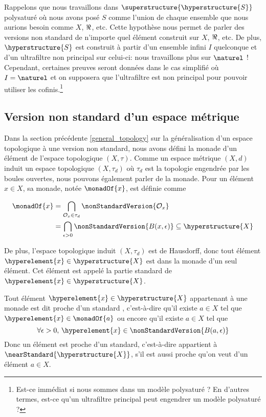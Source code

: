 Rappelons que nous travaillons dans $\superstructure{\hyperstructure{S}}$
polysaturé où nous avons posé $S$ comme l'union de chaque ensemble que nous
aurions besoin comme $X$, $\real$, etc. Cette hypothèse nous permet de parler des
versions non standard de n'importe quel élément construit sur $X$, $\real$, etc.
De plus, $\hyperstructure{S}$ est construit à partir d'un ensemble infini
$I$ quelconque et d'un ultrafiltre non principal sur celui-ci: nous travaillons
plus sur $\naturel$ !
Cependant, certaines preuves seront données dans le cas simplifié où $I =
\naturel$ et on supposera que l'ultrafiltre est non principal pour pouvoir
utiliser les cofinis.\footnote{Est-ce immédiat si nous sommes dans un modèle
	polysaturé ? En d'autres termes, est-ce qu'un ultrafiltre principal peut
engendrer un modèle polysaturé ?}

\subsection{Version non standard d'un espace métrique}

Dans la section précédente \ref{general_topology} sur la généralisation d'un
espace topologique à une version non standard, nous avons défini la monade d'un
élément de l'espace topologique $(X, \tau)$. Comme un espace métrique $(X, d)$
induit un espace topologique $(X, \tau_{d})$ où $\tau_{d}$ est la topologie
engendrée par les boules ouvertes, nous pouvons également parler de la monade.
Pour un élément $x \in X$, sa monade, notée $\monadOf{x}$, est
définie comme

\begin{align}
	\monadOf{x} & = \bigcap_{\mathcal{O}_{x} \in \tau_{d}}
	\nonStandardVersion{\mathcal{O}_{x}} \\
	& = \bigcap_{\epsilon > 0} \nonStandardVersion{B(x, \epsilon)} \subseteq
	\hyperstructure{X}
\end{align}

De plus, l'espace topologique induit $(X, \tau_{d})$ est de Hausdorff, donc tout
élément $\hyperelement{x} \in \hyperstructure{X}$ est dans la monade d'un seul
élément. Cet élément est appelé la partie standard de $\hyperelement{x} \in
\hyperstructure{X}$.

Tout élément $\hyperelement{x} \in \hyperstructure{X}$ appartenant à une monade
est dit \og proche d'un standard \fg, c'est-à-dire qu'il existe $a \in X$ tel que
$\hyperelement{x} \in \monadOf{a}$ ou encore qu'il existe $a \in X$ tel que
\begin{equation}
	\forall \epsilon > 0, \, \hyperelement{x} \in
	\nonStandardVersion{B(a, \epsilon)}
\end{equation}
Donc un élément est proche d'un standard, c'est-à-dire appartient à
$\nearStandard{\hyperstructure{X}}$, s'il est aussi proche qu'on veut d'un
élément $a \in X$.

